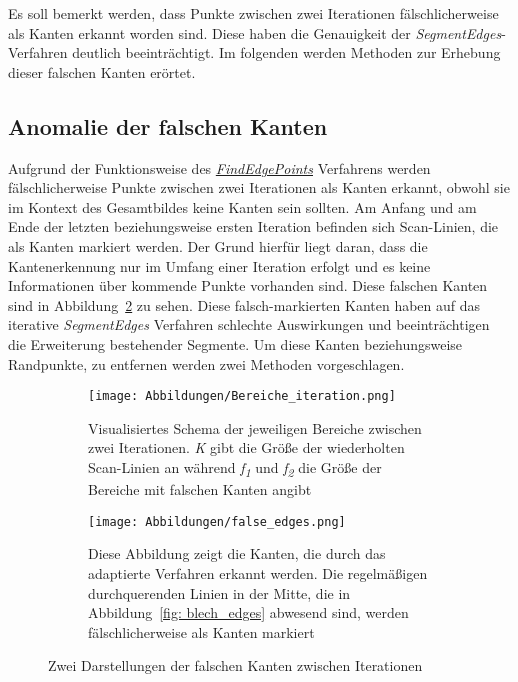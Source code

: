 Es soll bemerkt werden, dass Punkte zwischen zwei Iterationen fälschlicherweise als Kanten erkannt worden sind. Diese haben die Genauigkeit der \textit{SegmentEdges}-Verfahren deutlich beeinträchtigt. Im folgenden werden Methoden zur Erhebung dieser falschen Kanten erörtet.

\subsection{Anomalie der falschen Kanten} \label{false_edges}
Aufgrund der Funktionsweise des \textit{\hyperref[alg:find_edge_points]{FindEdgePoints}} Verfahrens werden fälschlicherweise Punkte zwischen zwei Iterationen als Kanten erkannt, obwohl sie im Kontext des Gesamtbildes keine Kanten sein sollten. Am Anfang und am Ende der letzten beziehungsweise ersten Iteration befinden sich Scan-Linien, die als Kanten markiert werden. Der Grund hierfür liegt daran, dass die Kantenerkennung nur im Umfang einer Iteration erfolgt und es keine Informationen über kommende Punkte vorhanden sind. Diese falschen Kanten sind in Abbildung~\ref{fig: false_edges_objekt} zu sehen. Diese falsch-markierten Kanten haben auf das iterative \textit{SegmentEdges} Verfahren schlechte Auswirkungen und beeinträchtigen die Erweiterung bestehender Segmente. Um diese Kanten beziehungsweise Randpunkte, zu entfernen werden zwei Methoden vorgeschlagen.

\begin{figure}[h]
	\centering
	\begin{subfigure}{0.49\textwidth}
		\texttt{[image: Abbildungen/Bereiche\_iteration.png]}
		\centering
		\caption[Bereiche zwischen zwei Iterationen]{Visualisiertes Schema der jeweiligen Bereiche zwischen zwei Iterationen. \textit{K} gibt die Größe der wiederholten Scan-Linien an während \textit{f\textsubscript{1}} und \textit{f\textsubscript{2}} die Größe der Bereiche mit falschen Kanten angibt \newline}
		\label{fig: false_edges_schema}
	\end{subfigure}
	\hfill
	\begin{subfigure}{0.49\textwidth}
		\texttt{[image: Abbildungen/false\_edges.png]}
		\centering
		\caption[Falschen Kanten zwischen zwei Iterationen]{Diese Abbildung zeigt die Kanten, die durch das adaptierte Verfahren erkannt werden. Die regelmäßigen durchquerenden Linien in der Mitte, die in Abbildung~\ref{fig: blech_edges} abwesend sind, werden fälschlicherweise als Kanten markiert}
		\label{fig: false_edges_objekt}
	\end{subfigure}
	\caption[Schematische und reelle Darstellung falscher Kanten]{Zwei Darstellungen der falschen Kanten zwischen Iterationen}
	\label{fig: false_edges}
\end{figure}

